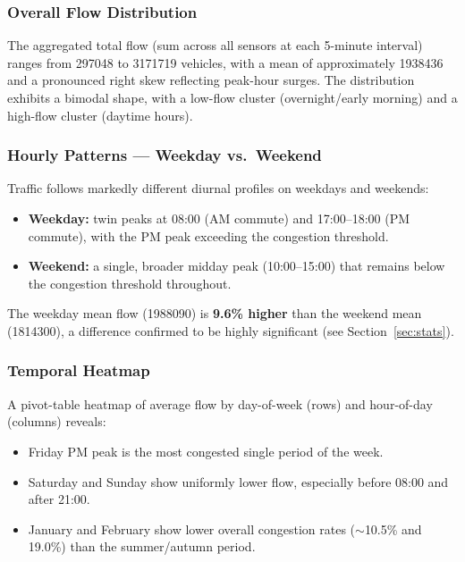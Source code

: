 \documentclass[12pt,a4paper]{article}
\begin{document}
\subsubsection{Overall Flow Distribution}

The aggregated total flow (sum across all sensors at each 5-minute interval) ranges from \num{297048} to \num{3171719} vehicles, with a mean of approximately \num{1938436} and a pronounced right skew reflecting peak-hour surges. The distribution exhibits a bimodal shape, with a low-flow cluster (overnight/early morning) and a high-flow cluster (daytime hours).

\subsubsection{Hourly Patterns — Weekday vs.\ Weekend}

Traffic follows markedly different diurnal profiles on weekdays and weekends:

\begin{itemize}
    \item \textbf{Weekday:} twin peaks at 08:00 (AM commute) and 17:00–18:00 (PM commute), with the PM peak exceeding the congestion threshold.
    \item \textbf{Weekend:} a single, broader midday peak (10:00–15:00) that remains below the congestion threshold throughout.
\end{itemize}

The weekday mean flow (\num{1988090}) is \textbf{9.6\% higher} than the weekend mean (\num{1814300}), a difference confirmed to be highly significant (see Section~\ref{sec:stats}).

\subsubsection{Temporal Heatmap}

A pivot-table heatmap of average flow by day-of-week (rows) and hour-of-day (columns) reveals:
\begin{itemize}
    \item Friday PM peak is the most congested single period of the week.
    \item Saturday and Sunday show uniformly lower flow, especially before 08:00 and after 21:00.
    \item January and February show lower overall congestion rates ($\sim$10.5\% and 19.0\%) than the summer/autumn period.
\end{itemize}
\end{document}
